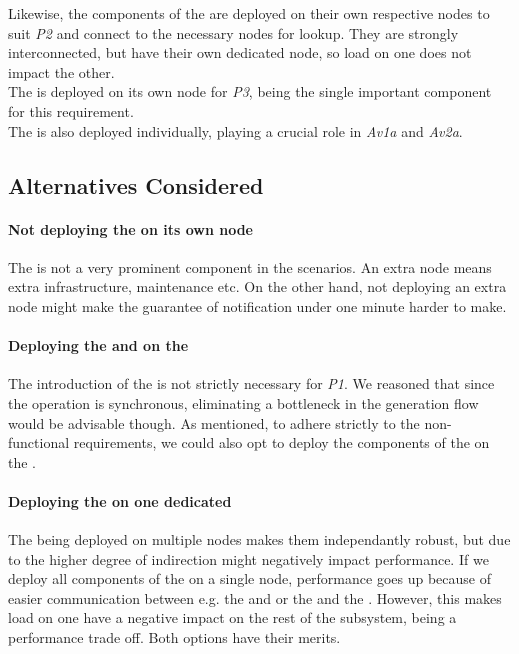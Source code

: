 Likewise, the components of the  are deployed on their own respective nodes to suit \emph{P2} and connect to the necessary nodes for lookup. They are strongly interconnected, but have their own dedicated node, so load on one does not impact the other.\\
The  is deployed on its own node for \emph{P3}, being the single important component for this requirement.\\
The  is also deployed individually, playing a crucial role in \emph{Av1a} and \emph{Av2a}.

\subsection*{Alternatives Considered}
\paragraph{Not deploying the  on its own node} The  is not a very prominent component in the scenarios. An extra node means extra infrastructure, maintenance etc. On the other hand, not deploying an extra node might make the guarantee of notification under one minute harder to make.

\paragraph{Deploying the  and  on the } The introduction of the  is not strictly necessary for \emph{P1}. We reasoned that since the  operation is synchronous, eliminating a bottleneck in the generation flow would be advisable though. As mentioned, to adhere strictly to the non-functional requirements, we could also opt to deploy the components of the  on the .

\paragraph{Deploying the  on one dedicated } The  being deployed on multiple nodes makes them independantly robust, but due to the higher degree of indirection might negatively impact performance. If we deploy all components of the  on a single node, performance goes up because of easier communication between e.g. the  and  or the  and the . However, this makes load on one  have a negative impact on the rest of the subsystem, being a performance trade off. Both options have their merits.